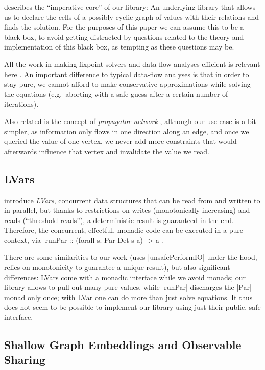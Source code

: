 \documentclass[manuscript,screen,acmsmall,nonacm]{acmart}
\begin{document}
 describes the “imperative core” of our library: An underlying library that allows us to declare the cells of a possibly cyclic graph of values with their relations and finds the solution. For the purposes of this paper we can assume this to be a black box, to avoid getting distracted by questions related to the theory and implementation of this black box, as tempting as these questions may be.

All the work in making fixpoint solvers and data-flow analyses efficient is relevant here \citep{kildall-73,kam-ullman-76}. An important difference to typical data-flow analyses is that in order to stay pure, we cannot afford to make conservative approximations while solving the equations (e.g.\ aborting with a safe guess after a certain number of iterations).

Also related is the concept of \emph{propagator network} \citep{propagator}, although our use-case is a bit simpler, as information only flows in one direction along an edge, and once we queried the value of one vertex, we never add more constraints that would afterwards influence that vertex and invalidate the value we read.

\subsection{LVars}

 introduce \emph{LVars}, concurrent data structures that can be read from and written to in parallel, but thanks to restrictions on writes (monotonically increasing) and reads (“threshold reads”), a deterministic result is guaranteed in the end. Therefore, the concurrent, effectful, monadic code can be executed in a pure context, via |runPar :: (forall s. Par Det s a) -> a|.

There are some similarities to our work (uses |unsafePerformIO| under the hood, relies on monotonicity to guarantee a unique result), but also significant differences: LVars come with a monadic interface while we avoid monads; our library allows to pull out many pure values, while |runPar| discharges the |Par| monad only once; with LVar one can do more than just solve equations. It thus does not seem to be possible to implement our library using just their public, safe interface.


\subsection{Shallow Graph Embeddings and Observable Sharing}
\end{document}
